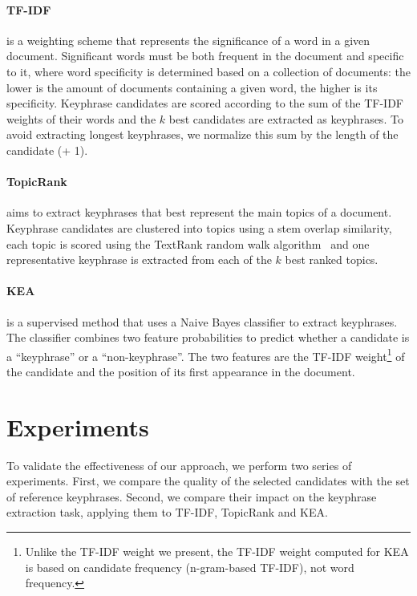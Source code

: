   \paragraph{TF-IDF~\textnormal{\cite{jones1972tfidf}}} is a weighting scheme
  that represents the significance of a word in a given document. Significant
  words must be both frequent in the document and specific to it, where word
  specificity is determined based on a collection of documents: the lower is the
  amount of documents containing a given word, the higher is its specificity.
  Keyphrase candidates are scored according to the sum of the TF-IDF weights of
  their words and the $k$ best candidates are extracted as keyphrases. To avoid
  extracting longest keyphrases, we normalize this sum by the length of the
  candidate (+ 1).

  \paragraph{TopicRank~\textnormal{\cite{bougouin2013topicrank}}} aims to
  extract keyphrases that best represent the main topics of a document.
  Keyphrase candidates are clustered into topics using a stem overlap
  similarity, each topic is scored using the TextRank random walk
  algorithm~\cite{mihalcea2004textrank} and one representative keyphrase is
  extracted from each of the $k$ best ranked topics.

  \paragraph{KEA~\textnormal{\cite{witten1999kea}}} is a supervised method that
  uses a Naive Bayes classifier to extract keyphrases. The classifier combines
  two feature probabilities to predict whether a candidate is a ``keyphrase'' or
  a ``non-keyphrase''. The two features are the TF-IDF weight\footnote{Unlike
  the TF-IDF weight we present, the TF-IDF weight computed for KEA is based on
  candidate frequency (n-gram-based TF-IDF), not word frequency.} of the
  candidate and the position of its first appearance in the document.

\section{Experiments}
\label{sec:evaluation}
  To validate the effectiveness of our approach, we perform two series of
  experiments. First, we compare the quality of the selected candidates with the
  set of reference keyphrases. Second, we compare their impact on the keyphrase
  extraction task, applying them to TF-IDF, TopicRank and KEA.

